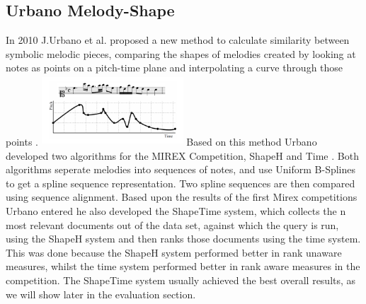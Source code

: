 \documentclass{llncs}
\begin{document}
		\subsection{Urbano Melody-Shape}
        In 2010 J.Urbano et al. proposed a new method to calculate similarity between symbolic melodic pieces, comparing the shapes of melodies created by looking at notes as points on a pitch-time plane and interpolating a curve through those points \cite{five_point_five}.
        \includegraphics[width=200px,height=100px,keepaspectratio]{one_of_five_point_one}
        Based on this method Urbano developed two algorithms for the MIREX Competition, ShapeH and Time \cite{five_point_two}. Both algorithms seperate melodies into sequences of notes, and use Uniform B-Splines to get a spline sequence representation. Two spline sequences are then compared using sequence alignment. Based upon the results of the first Mirex competitions Urbano entered he also developed the ShapeTime system, which collects the n most relevant documents out of the data set, against which the query is run, using the ShapeH system and then ranks those documents using the time system. This was done because the ShapeH system performed better in rank unaware measures, whilst the time system performed better in rank aware measures in the competition. The ShapeTime system usually achieved the best overall results, as we will show later in the evaluation section.
\end{document}
